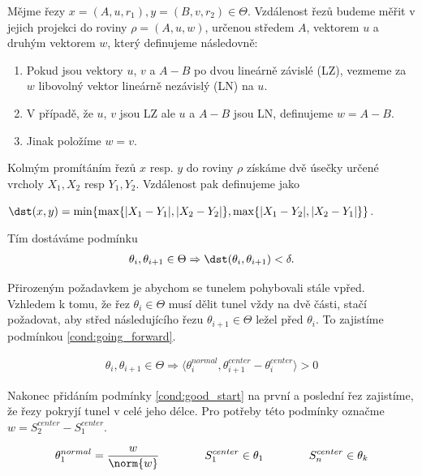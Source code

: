 \begin{defi}
Mějme řezy $ x = (A, u, r_1), y = (B, v, r_2) \in \Theta $. Vzdálenost řezů budeme
měřit v jejich projekci do roviny $ \rho = (A, u, w) $, určenou středem $ A $,
vektorem $ u $ a druhým vektorem $ w $, který definujeme následovně:
    \begin{enumerate}[label={(\arabic*)}]
        \item Pokud jsou vektory $ u $, $ v $ a $ A - B $ po dvou lineárně závislé (LZ), vezmeme
            za $ w $ libovolný vektor lineárně nezávislý (LN) na $ u $.
        \item V případě, že $ u $, $ v $ jsou LZ ale $ u $ a $ A - B $ jsou LN,
            definujeme $ w = A - B $.
        \item Jinak položíme $ w = v $.
    \end{enumerate}
Kolmým promítáním řezů $ x $ resp. $ y $ do roviny  $ \rho $ získáme dvě úsečky
určené vrcholy $X_1, X_2 $ resp $Y_1, Y_2 $. Vzdálenost pak definujeme jako
\begin{center}
    $ \dst(x, y) = \min\{ \max\{|X_1 - Y_1|, |X_2 - Y_2|\}, \max\{|X_1 - Y_2|, |X_2 - Y_1|\}\}$.
\end{center}
\end{defi}

Tím dostáváme podmínku
\begin{align}
    \theta_i, \theta_{i+1} \in \Theta \Rightarrow \dst(\theta_i, \theta_{i+1}) < \delta.
    \label{cond:distance}
\end{align}


Přirozeným požadavkem je abychom se tunelem pohybovali stále vpřed.
Vzhledem k tomu, že řez $ \theta_i \in \Theta $ musí dělit tunel vždy na dvě části, stačí
požadovat, aby střed následujícího řezu $ \theta_{i + 1} \in \Theta $ ležel před
$ \theta_i $. To zajistíme podmínkou \ref{cond:going_forward}.

\begin{align}
    \theta_i, \theta_{i+1} \in \Theta
        \Rightarrow \langle \theta_i^{normal}, \theta_{i+1}^{center} - \theta_i^{center} \rangle > 0
        \label{cond:going_forward}
\end{align}

Nakonec přidáním podmínky \ref{cond:good_start} na první a poslední řez zajistíme,
že řezy pokryjí tunel v celé jeho délce. Pro potřeby této podmínky označme
$ w = S_2^{center} - S_1^{center} $.

\begin{align}
    \theta_1^{normal} = \frac{w}{\norm{w}}
    \qquad  \qquad S_1^{center} \in \theta_1
    \qquad  \qquad S_n^{center} \in \theta_k
    \label{cond:good_start}
\end{align}

